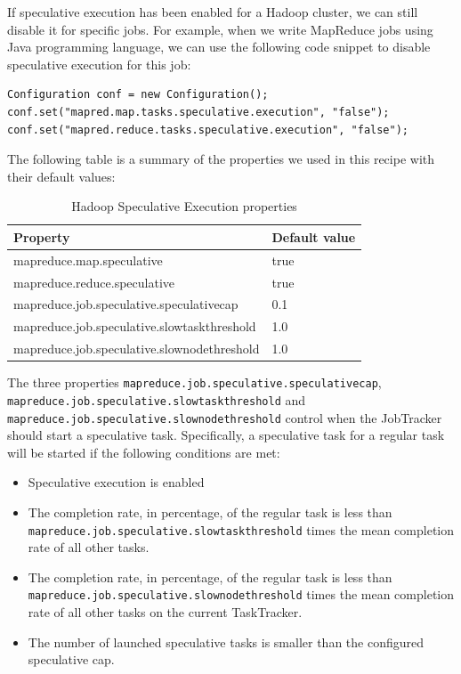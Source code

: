 If speculative execution has been enabled for a Hadoop cluster, we can still disable it for specific jobs. For example, when we write MapReduce jobs using Java programming language, we can use the following code snippet to disable speculative execution for this job:
\lstset{style=bashstyle}
\begin{lstlisting}
Configuration conf = new Configuration();
conf.set("mapred.map.tasks.speculative.execution", "false");
conf.set("mapred.reduce.tasks.speculative.execution", "false");
\end{lstlisting}

The following table is a summary of the properties we used in this recipe with their default values:

\begin{table}[h]
  \centering
  \begin{tabular}{ll}
    \toprule
    \textbf{Property} & \textbf{Default value} \\ \midrule
      mapreduce.map.speculative & true \\
      mapreduce.reduce.speculative & true \\
      mapreduce.job.speculative.speculativecap & 0.1 \\
      mapreduce.job.speculative.slowtaskthreshold & 1.0 \\
      mapreduce.job.speculative.slownodethreshold & 1.0 \\ \bottomrule
  \end{tabular}
  \caption{Hadoop Speculative Execution properties}\label{tbl:speculative}
\end{table}

The three properties \verb|mapreduce.job.speculative.speculativecap|, \verb|mapreduce.job.speculative.slowtaskthreshold| and \verb|mapreduce.job.speculative.slownodethreshold| control when the JobTracker should start a speculative task. Specifically, a speculative task for a regular task will be started if the following conditions are met: \\
\begin{itemize}
  \item Speculative execution is enabled
  \item The completion rate, in percentage, of the regular task is less than \verb|mapreduce.job.speculative.slowtaskthreshold| times the mean completion rate of all other tasks.
  \item The completion rate, in percentage, of the regular task is less than \verb|mapreduce.job.speculative.slownodethreshold| times the mean completion rate of all other tasks on the current TaskTracker.
  \item The number of launched speculative tasks is smaller than the configured speculative cap.
\end{itemize}
